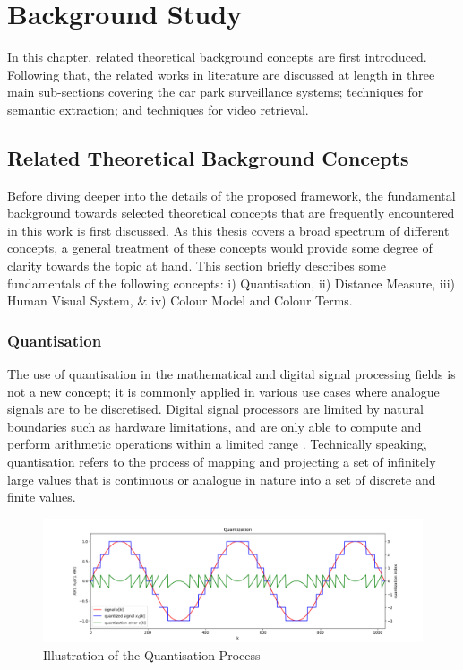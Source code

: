 


\chapter{Background Study} 
\label{section:litreview}

In this chapter, related theoretical background concepts are first introduced. 
Following that, the related works in literature are discussed at length in three main sub-sections covering the car park surveillance systems; techniques for semantic extraction; and techniques for video retrieval.


\section{Related Theoretical Background Concepts}
\label{subsec:relatedConcepts}

Before diving deeper into the details of the proposed framework,
the fundamental background towards selected theoretical concepts that are frequently encountered in this work is first discussed. As this thesis covers a broad spectrum of
different concepts, a general treatment of these concepts would provide
some degree of clarity towards the topic at hand. This section briefly describes
some fundamentals of the following concepts: i) Quantisation, ii) Distance
Measure, iii) Human Visual System, \& iv) Colour Model and Colour Terms.


\vspace{1em}
\subsection{Quantisation}

The use of quantisation in the mathematical and digital signal processing fields
is not a new concept; it is commonly applied in various use cases where analogue signals are to be discretised. Digital
signal processors are limited by natural boundaries such as hardware
limitations, and are only able to compute and perform arithmetic operations
within a limited range \cite{spors_2018}. Technically speaking, quantisation refers to the
process of mapping and projecting a set of infinitely large values that is
continuous or analogue in nature into a set of discrete and finite values.

\begin{figure}[hbt!]
 \centering
 \includegraphics[width=\textwidth]{image/general/quantization.png}
 \caption{Illustration of the Quantisation Process}
 \label{fig:quantize}
\end{figure}

